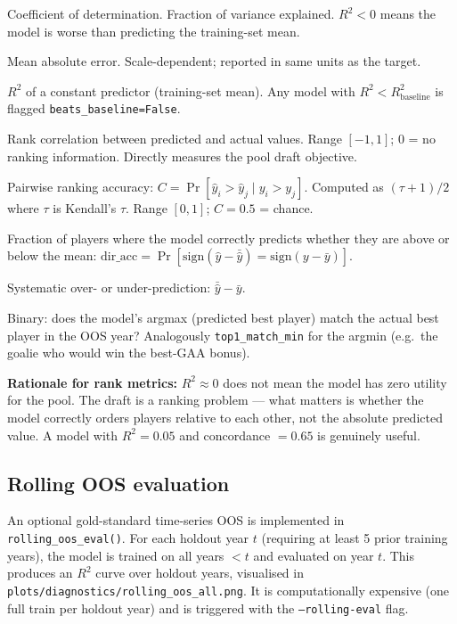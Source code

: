 \documentclass[11pt, a4paper]{article}
\begin{document}
\begin{description}[leftmargin=3cm, style=nextline]
  \item[$R^2$] Coefficient of determination. Fraction of variance explained.
        $R^2 < 0$ means the model is worse than predicting the training-set mean.
  \item[MAE] Mean absolute error. Scale-dependent; reported in same units as the target.
  \item[Baseline $R^2$] $R^2$ of a constant predictor (training-set mean). Any model with
        $R^2 < R^2_{\text{baseline}}$ is flagged \texttt{beats\_baseline=False}.
  \item[Spearman $\rho$] Rank correlation between predicted and actual values. Range $[-1, 1]$;
        0 = no ranking information. Directly measures the pool draft objective.
  \item[Concordance] Pairwise ranking accuracy:
        $C = \Pr[\hat{y}_i > \hat{y}_j \mid y_i > y_j]$.
        Computed as $({\tau}+1)/2$ where $\tau$ is Kendall's $\tau$.
        Range $[0,1]$; $C = 0.5$ = chance.
  \item[Directional accuracy] Fraction of players where the model correctly predicts whether
        they are above or below the mean: $\text{dir\_acc} = \Pr[\text{sign}(\hat{y}-\bar{\hat{y}}) = \text{sign}(y - \bar{y})]$.
  \item[Bias] Systematic over- or under-prediction: $\bar{\hat{y}} - \bar{y}$.
  \item[\texttt{top1\_match\_max}] Binary: does the model's argmax (predicted best player)
        match the actual best player in the OOS year? Analogously \texttt{top1\_match\_min}
        for the argmin (e.g.\ the goalie who would win the best-GAA bonus).
\end{description}

\textbf{Rationale for rank metrics:} $R^2 \approx 0$ does not mean the model has zero utility
for the pool. The draft is a ranking problem — what matters is whether the model correctly
orders players relative to each other, not the absolute predicted value. A model with
$R^2 = 0.05$ and concordance $= 0.65$ is genuinely useful.

\subsection{Rolling OOS evaluation}

An optional gold-standard time-series OOS is implemented in \texttt{rolling\_oos\_eval()}.
For each holdout year $t$ (requiring at least 5 prior training years), the model is trained on
all years $< t$ and evaluated on year $t$. This produces an $R^2$ curve over holdout years,
visualised in \texttt{plots/diagnostics/rolling\_oos\_all.png}. It is computationally expensive
(one full train per holdout year) and is triggered with the \texttt{--rolling-eval} flag.
\end{document}
